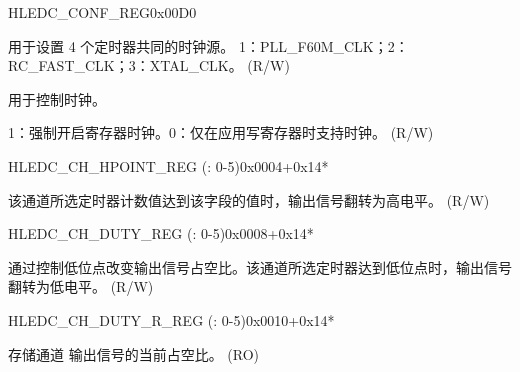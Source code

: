 \begin{register}{H}{LEDC\_CONF\_REG}{0x00D0}\label{regdesc:LEDCCONFREG}
%
%
%
\regnewline%
\begin{regdesc}\begin{reglist}
\label{fielddesc:LEDCCLKSEL}\item [LEDC\_CLK\_SEL] 用于设置 4 个定时器共同的时钟源。
1：PLL\_F60M\_CLK；2：RC\_FAST\_CLK；3：XTAL\_CLK。 (R/W)
\label{fielddesc:LEDCCLKEN}\item [LEDC\_CLK\_EN] 用于控制时钟。

1：强制开启寄存器时钟。0：仅在应用写寄存器时支持时钟。 (R/W)
\end{reglist}\end{regdesc}
\end{register}


\begin{register}{H}{LEDC\_CH\_HPOINT\_REG (: 0-5)}{0x0004+0x14*}\label{regdesc:LEDCCHNHPOINTREG}
%
%
\regnewline%
\begin{regdesc}\begin{reglist}
\label{fielddesc:LEDCHPOINTCHN}\item [LEDC\_HPOINT\_CH\regindex{n}] 该通道所选定时器计数值达到该字段的值时，输出信号翻转为高电平。 (R/W)
\end{reglist}\end{regdesc}
\end{register}


\begin{register}{H}{LEDC\_CH\_DUTY\_REG (: 0-5)}{0x0008+0x14*}\label{regdesc:LEDCCHNDUTYREG}
%
%
\regnewline%
\begin{regdesc}\begin{reglist}
\label{fielddesc:LEDCDUTYCHN}\item [LEDC\_DUTY\_CH\regindex{n}] 通过控制低位点改变输出信号占空比。该通道所选定时器达到低位点时，输出信号翻转为低电平。 (R/W)
\end{reglist}\end{regdesc}
\end{register}


\begin{register}{H}{LEDC\_CH\_DUTY\_R\_REG (: 0-5)}{0x0010+0x14*}\label{regdesc:LEDCCHNDUTYRREG}
%
%
\regnewline%
\begin{regdesc}\begin{reglist}
\label{fielddesc:LEDCDUTYRCHN}\item [LEDC\_DUTY\_R\_CH\regindex{n}] 存储通道  输出信号的当前占空比。 (RO)
\end{reglist}\end{regdesc}
\end{register}


